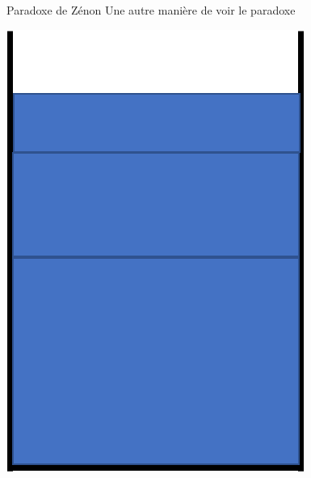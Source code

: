 \documentclass[usenames, dvipsnames]{beamer}
\begin{document}
\begin{frame}[plain]{Paradoxe de Zénon}
Une autre manière de voir le paradoxe
\begin{center}
\includegraphics[scale=0.5]{images/glass3.png}
\end{center}
\end{frame}
\end{document}
